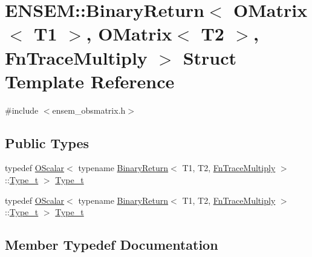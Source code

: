 \hypertarget{structENSEM_1_1BinaryReturn_3_01OMatrix_3_01T1_01_4_00_01OMatrix_3_01T2_01_4_00_01FnTraceMultiply_01_4}{}\section{E\+N\+S\+EM\+:\+:Binary\+Return$<$ O\+Matrix$<$ T1 $>$, O\+Matrix$<$ T2 $>$, Fn\+Trace\+Multiply $>$ Struct Template Reference}
\label{structENSEM_1_1BinaryReturn_3_01OMatrix_3_01T1_01_4_00_01OMatrix_3_01T2_01_4_00_01FnTraceMultiply_01_4}


{\ttfamily \#include $<$ensem\+\_\+obsmatrix.\+h$>$}

\subsection*{Public Types}
\begin{DoxyCompactItemize}
\item 
typedef \mbox{\hyperlink{classENSEM_1_1OScalar}{O\+Scalar}}$<$ typename \mbox{\hyperlink{structENSEM_1_1BinaryReturn}{Binary\+Return}}$<$ T1, T2, \mbox{\hyperlink{structENSEM_1_1FnTraceMultiply}{Fn\+Trace\+Multiply}} $>$\+::\mbox{\hyperlink{structENSEM_1_1BinaryReturn_3_01OMatrix_3_01T1_01_4_00_01OMatrix_3_01T2_01_4_00_01FnTraceMultiply_01_4_a1064f843fb99598f8501245bce56e77f}{Type\+\_\+t}} $>$ \mbox{\hyperlink{structENSEM_1_1BinaryReturn_3_01OMatrix_3_01T1_01_4_00_01OMatrix_3_01T2_01_4_00_01FnTraceMultiply_01_4_a1064f843fb99598f8501245bce56e77f}{Type\+\_\+t}}
\item 
typedef \mbox{\hyperlink{classENSEM_1_1OScalar}{O\+Scalar}}$<$ typename \mbox{\hyperlink{structENSEM_1_1BinaryReturn}{Binary\+Return}}$<$ T1, T2, \mbox{\hyperlink{structENSEM_1_1FnTraceMultiply}{Fn\+Trace\+Multiply}} $>$\+::\mbox{\hyperlink{structENSEM_1_1BinaryReturn_3_01OMatrix_3_01T1_01_4_00_01OMatrix_3_01T2_01_4_00_01FnTraceMultiply_01_4_a1064f843fb99598f8501245bce56e77f}{Type\+\_\+t}} $>$ \mbox{\hyperlink{structENSEM_1_1BinaryReturn_3_01OMatrix_3_01T1_01_4_00_01OMatrix_3_01T2_01_4_00_01FnTraceMultiply_01_4_a1064f843fb99598f8501245bce56e77f}{Type\+\_\+t}}
\end{DoxyCompactItemize}


\subsection{Member Typedef Documentation}
\mbox{\label{structENSEM_1_1BinaryReturn_3_01OMatrix_3_01T1_01_4_00_01OMatrix_3_01T2_01_4_00_01FnTraceMultiply_01_4_a1064f843fb99598f8501245bce56e77f}} 
